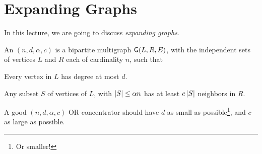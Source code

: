 %

\ChapterPrefix{}
\ChapterGen{}







\section{Expanding Graphs}

In this lecture, we are going to discuss {\em expanding graphs}.

\begin{defn}
    An $(n,d,\alpha, c)$  is a bipartite
    multigraph $\mathsf{G}(L, R, E)$, with the independent sets of
    vertices $L$ and $R$ each of cardinality $n$, such that
    \begin{compactenumi}
        \item Every vertex in $L$ has degree at most $d$.
        
        \item Any subset $S$ of vertices of $L$, with $\left| {S} \right| \leq
        \alpha n$ has at least $c \left| {S} \right|$ neighbors in $R$.
    \end{compactenumi}
\end{defn}

A good $(n,d,\alpha, c)$ OR-concentrator should have $d$ as small as
possible\footnote{Or smaller!}, and $c$ as large as possible.


